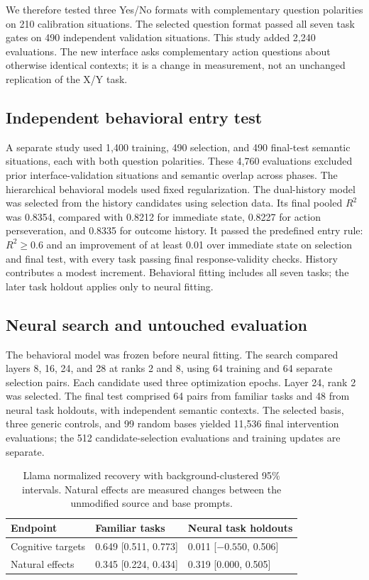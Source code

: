 \documentclass{article}
\begin{document}
We therefore tested three Yes/No formats with complementary question polarities on 210 calibration situations. The selected question format passed all seven task gates on 490 independent validation situations. This study added 2,240 evaluations. The new interface asks complementary action questions about otherwise identical contexts; it is a change in measurement, not an unchanged replication of the X/Y task.

\subsection{Independent behavioral entry test}
A separate study used 1,400 training, 490 selection, and 490 final-test semantic situations, each with both question polarities. These 4,760 evaluations excluded prior interface-validation situations and semantic overlap across phases. The hierarchical behavioral models used fixed regularization. The dual-history model was selected from the history candidates using selection data. Its final pooled $R^2$ was 0.8354, compared with 0.8212 for immediate state, 0.8227 for action perseveration, and 0.8335 for outcome history. It passed the predefined entry rule: $R^2\geq0.6$ and an improvement of at least 0.01 over immediate state on selection and final test, with every task passing final response-validity checks. History contributes a modest increment. Behavioral fitting includes all seven tasks; the later task holdout applies only to neural fitting.

\subsection{Neural search and untouched evaluation}
The behavioral model was frozen before neural fitting. The search compared layers 8, 16, 24, and 28 at ranks 2 and 8, using 64 training and 64 separate selection pairs. Each candidate used three optimization epochs. Layer 24, rank 2 was selected. The final test comprised 64 pairs from familiar tasks and 48 from neural task holdouts, with independent semantic contexts. The selected basis, three generic controls, and 99 random bases yielded 11,536 final intervention evaluations; the 512 candidate-selection evaluations and training updates are separate.

\begin{table}[htbp]
\centering\small
\begin{tabular}{lll}
\toprule
Endpoint & Familiar tasks & Neural task holdouts \\
\midrule
Cognitive targets & 0.649 [0.511, 0.773] & 0.011 [$-0.550$, 0.506] \\
Natural effects & 0.345 [0.224, 0.434] & 0.319 [0.000, 0.505] \\
\bottomrule
\end{tabular}
\caption{Llama normalized recovery with background-clustered 95\% intervals. Natural effects are measured changes between the unmodified source and base prompts.}
\end{table}
\end{document}
